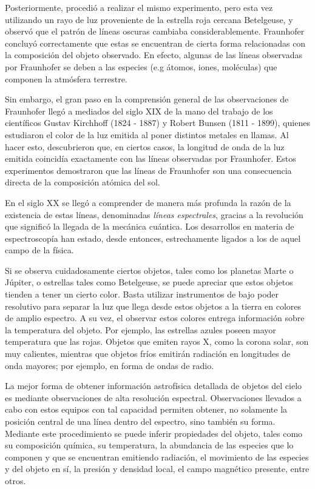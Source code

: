 Posteriormente, procedió a realizar el mismo experimento, pero esta vez utilizando un rayo de luz proveniente de la estrella roja cercana Betelgeuse, y observó que el patrón de líneas oscuras cambiaba considerablemente. Fraunhofer concluyó correctamente que estas se encuentran de cierta forma relacionadas con la composición del objeto observado. En efecto, algunas de las líneas observadas por Fraunhofer se deben a las especies (e.g átomos, iones, moléculas) que componen la atmósfera terrestre.

Sin embargo, el gran paso en la comprensión general de las observaciones de Fraunhofer llegó a mediados del siglo XIX de la mano del trabajo de los científicos Gustav Kirchhoff (1824 - 1887) y Robert Bunsen (1811 - 1899), quienes estudiaron el color de la luz emitida al poner distintos metales en llamas. Al hacer esto, descubrieron que, en ciertos casos, la longitud de onda de la luz emitida coincidía exactamente con las líneas observadas por Fraunhofer. Estos experimentos demostraron que las líneas de Fraunhofer son una consecuencia directa de la composición atómica del sol.

En el siglo XX se llegó a comprender de manera más profunda la razón de la existencia de estas líneas, denominadas \textit{líneas espectrales}, gracias a la revolución que significó la llegada de la mecánica cuántica. Los desarrollos en materia de espectroscopía han estado, desde entonces, estrechamente ligados a los de aquel campo de la física.

Si se observa cuidadosamente ciertos objetos, tales como los planetas Marte o Júpiter, o estrellas tales como Betelgeuse, se puede apreciar que estos objetos tienden a tener un cierto color. Basta utilizar instrumentos de bajo poder resolutivo para separar la luz que llega desde estos objetos a la tierra en colores de amplio espectro. A su vez, el observar estos colores entrega información sobre la temperatura del objeto. Por ejemplo, las estrellas azules poseen mayor temperatura que las rojas. Objetos que emiten rayos X, como la corona solar, son muy calientes, mientras que objetos fríos emitirán radiación en longitudes de onda mayores; por ejemplo, en forma de ondas de radio.

La mejor forma de obtener información astrofísica detallada de objetos del cielo es mediante observaciones de alta resolución espectral. Observaciones llevados a cabo con estos equipos con tal capacidad permiten obtener, no solamente la posición central de una línea dentro del espectro, sino también su forma. Mediante este procedimiento se puede inferir propiedades del objeto, tales como su composición química, su temperatura, la abundancia de las especies que lo componen y que se encuentran emitiendo radiación, el movimiento de las especies y del objeto en sí, la presión y densidad local, el campo magnético presente, entre otros.


